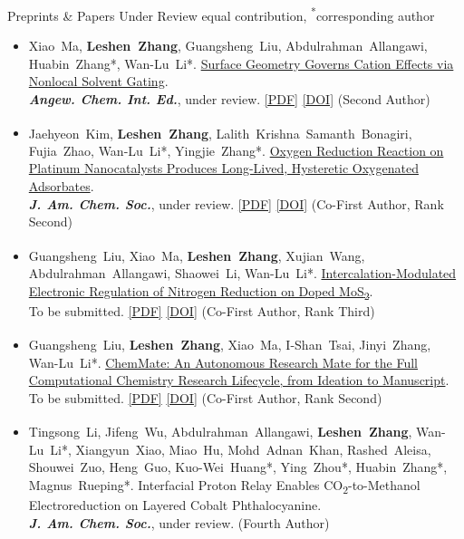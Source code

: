 \documentclass{resume} %
\newcommand{\me}{\textbf{\setbox0\hbox{Leshen Zhang}\rlap{\rule[-2.4pt]{\wd0}{0.9pt}}\box0}} %
\newcommand{\eq}{\textsuperscript{\textdaggerdbl}}
\newcommand{\ptitle}[1]{#1} %
\newcommand{\bluehref}[2]{{\hypersetup{urlcolor=blue}\href{#1}{#2}}} %
\begin{document}
\begin{rSection}{Preprints \& Papers Under Review \hfill {\normalfont\footnotesize \textsuperscript{\textdaggerdbl}equal contribution, \textsuperscript{*}corresponding author}}
{\begin{itemize}[leftmargin=2.6em,labelsep=0.4em,itemsep=1pt]
  \item[\textbf{[S.5]}] \hypertarget{S.5}{}Xiao~Ma, \me, Guangsheng~Liu, Abdulrahman~Allangawi, Huabin~Zhang*, Wan-Lu~Li*. \href{https://doi.org/10.26434/chemrxiv.15008697/v1}{\ptitle{Surface Geometry Governs Cation Effects via Nonlocal Solvent Gating}}. \\ \textbf{\textit{Angew. Chem. Int. Ed.}}, under review. \bluehref{https://chemrxiv.org/doi/pdf/10.26434/chemrxiv.15008697/v1}{[PDF]} \bluehref{https://doi.org/10.26434/chemrxiv.15008697/v1}{[DOI]} (Second Author)
  \item[\textbf{[S.6]}] \hypertarget{S.6}{}Jaehyeon~Kim\eq, \me\eq, Lalith~Krishna~Samanth~Bonagiri, Fujia~Zhao, Wan-Lu~Li*, Yingjie~Zhang*. \href{https://doi.org/10.48550/arXiv.2608.08050}{\ptitle{Oxygen Reduction Reaction on Platinum Nanocatalysts Produces Long-Lived, Hysteretic Oxygenated Adsorbates}}. \\ \textbf{\textit{J. Am. Chem. Soc.}}, under review. \bluehref{https://arxiv.org/pdf/2608.08050}{[PDF]} \bluehref{https://doi.org/10.48550/arXiv.2608.08050}{[DOI]} (Co-First Author, Rank Second)
  \item[\textbf{[S.7]}] \hypertarget{S.7}{}Guangsheng~Liu\eq, Xiao~Ma\eq, \me\eq, Xujian~Wang, Abdulrahman~Allangawi, Shaowei~Li, Wan-Lu~Li*. \href{https://doi.org/10.26434/chemrxiv.15003924/v1}{\ptitle{Intercalation-Modulated Electronic Regulation of Nitrogen Reduction on Doped MoS\textsubscript{2}}}. \\ To be submitted. \bluehref{https://leshenzhang.github.io/papers/S4_Liu2026_ChemRxiv.pdf}{[PDF]} \bluehref{https://doi.org/10.26434/chemrxiv.15003924/v1}{[DOI]} (Co-First Author, Rank Third)
  \item[\textbf{[S.8]}] \hypertarget{S.8}{}Guangsheng~Liu\eq, \me\eq, Xiao~Ma, I-Shan~Tsai, Jinyi~Zhang, Wan-Lu~Li*. \href{https://doi.org/10.26434/chemrxiv.15006055/v1}{\ptitle{ChemMate: An Autonomous Research Mate for the Full Computational Chemistry Research Lifecycle, from Ideation to Manuscript}}. \\ To be submitted. \bluehref{https://leshenzhang.github.io/papers/S5_Liu2026_ChemRxiv.pdf}{[PDF]} \bluehref{https://doi.org/10.26434/chemrxiv.15006055/v1}{[DOI]} (Co-First Author, Rank Second)
  \item[\textbf{[S.9]}] \hypertarget{S.9}{}Tingsong~Li\eq, Jifeng~Wu\eq, Abdulrahman~Allangawi\eq, \me, Wan-Lu~Li*, Xiangyun~Xiao, Miao~Hu, Mohd~Adnan~Khan, Rashed~Aleisa, Shouwei~Zuo, Heng~Guo, Kuo-Wei~Huang*, Ying~Zhou*, Huabin~Zhang*, Magnus~Rueping*. \ptitle{Interfacial Proton Relay Enables CO\textsubscript{2}-to-Methanol Electroreduction on Layered Cobalt Phthalocyanine}. \\ \textbf{\textit{J. Am. Chem. Soc.}}, under review. (Fourth Author)

\end{itemize}}
\end{rSection}
\end{document}
